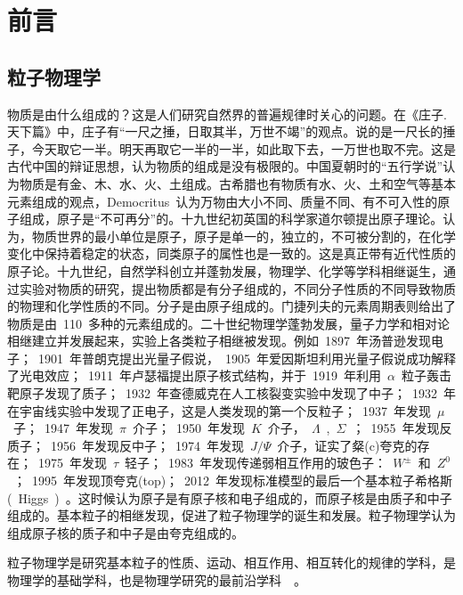 \chapter{前言}

\section{粒子物理学}

物质是由什么组成的？这是人们研究自然界的普遍规律时关心的问题。在《庄子.天下篇》中，庄子有“一尺之捶，日取其半，万世不竭”的观点。说的是一尺长的捶子，今天取它一半。明天再取它一半的一半，如此取下去，一万世也取不完。这是古代中国的辩证思想，认为物质的组成是没有极限的。中国夏朝时的“五行学说”认为物质是有金、木、水、火、土组成。古希腊也有物质有水、火、土和空气等基本元素组成的观点，Democritus~认为万物由大小不同、质量不同、有不可入性的原子组成，原子是“不可再分”的。十九世纪初英国的科学家道尔顿提出原子理论。认为，物质世界的最小单位是原子，原子是单一的，独立的，不可被分割的，在化学变化中保持着稳定的状态，同类原子的属性也是一致的。这是真正带有近代性质的原子论。十九世纪，自然学科创立并蓬勃发展，物理学、化学等学科相继诞生，通过实验对物质的研究，提出物质都是有分子组成的，不同分子性质的不同导致物质的物理和化学性质的不同。分子是由原子组成的。门捷列夫的元素周期表则给出了物质是由~110~多种的元素组成的。二十世纪物理学蓬勃发展，量子力学和相对论相继建立并发展起来，实验上各类粒子相继被发现。例如~1897~年汤普逊发现电子；~1901~年普朗克提出光量子假说，~1905~年爱因斯坦利用光量子假说成功解释了光电效应；~1911~年卢瑟福提出原子核式结构，并于~1919~年利用~$\alpha$~粒子轰击靶原子发现了质子；~1932~年查德威克在人工核裂变实验中发现了中子；~1932~年在宇宙线实验中发现了正电子，这是人类发现的第一个反粒子；~1937~年发现~$\mu$~子；~1947~年发现~$\pi$~介子；~1950~年发现~$K$~介子，~$\Lambda$~,~$\Sigma$~；~1955~年发现反质子；~1956~年发现反中子；~1974~年发现~$J/\Psi$~介子，证实了粲(c)夸克的存在；~1975~年发现~$\tau$~轻子；~1983~年发现传递弱相互作用的玻色子：~$W^{\pm}$~和~$Z^{0}$~；~1995~年发现顶夸克(top)；~2012~年发现标准模型的最后一个基本粒子希格斯(~Higgs~)~\cite{ATLAS:2012}\cite{CMS:2012}。这时候认为原子是有原子核和电子组成的，而原子核是由质子和中子组成的。基本粒子的相继发现，促进了粒子物理学的诞生和发展。粒子物理学认为组成原子核的质子和中子是由夸克组成的。~\cite{2014lv}

粒子物理学是研究基本粒子的性质、运动、相互作用、相互转化的规律的学科，是物理学的基础学科，也是物理学研究的最前沿学科~\cite{zhangns2015}~\cite{duds2015}。

